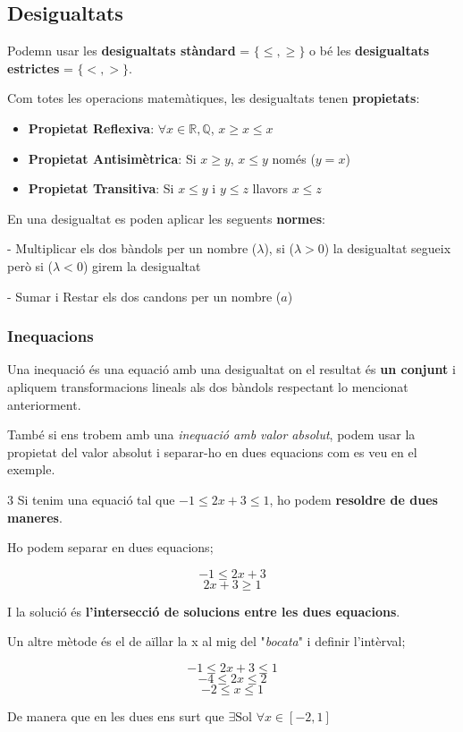 \documentclass[12pt]{article}
\newcommand{\R}{\mathbb{R}}
\newcommand{\Q}{\mathbb{Q}}
\begin{document}
\subsection{Desigualtats}

Podemn usar les \textbf{desigualtats stàndard} = $\{\leq, \geq\}$ o bé les \textbf{desigualtats estrictes} = $\{<,>\}$.

Com totes les operacions matemàtiques, les desigualtats tenen \textbf{propietats}:

\begin{itemize}
    \item \textbf{Propietat Reflexiva}: $\forall x \in \R, \Q$, $x \geq x \leq x$
    \item \textbf{Propietat Antisimètrica}: Si $ x\geq y$, $x \leq y$ només ($y=x$)
    \item \textbf{Propietat Transitiva}: Si $x \leq y$ i $ y \leq z$ llavors $x \leq z$
\end{itemize}

En una desigualtat es poden aplicar les seguents \textbf{normes}:

- Multiplicar els dos bàndols per un nombre ($\lambda$), si ($\lambda > 0$) la desigualtat segueix però si ($\lambda < 0$) girem la desigualtat

- Sumar i Restar els dos candons per un nombre ($a$)

\subsubsection{Inequacions}

Una inequació és una equació amb una desigualtat on el resultat és \textbf{un conjunt} i apliquem transformacions lineals als dos bàndols respectant lo mencionat anteriorment.

També si ens trobem amb una \textit{inequació amb valor absolut}, podem usar la propietat del valor absolut i separar-ho en dues equacions com es veu en el exemple.

\begin{examplebox}{3}
    Si tenim una equació tal que $-1 \leq 2x + 3 \leq 1$, ho podem \textbf{resoldre de dues maneres}.

    Ho podem separar en dues equacions;

    \[ -1 \leq 2x + 3\]
    \[2x+3 \geq 1\]

    I la solució és \textbf{l'intersecció de solucions entre les dues equacions}.

    Un altre mètode és el de aïllar la x al mig del "\textit{bocata}" i definir l'intèrval;

    \[ -1 \leq 2x + 3 \leq 1\]
    \[ -4 \leq 2x  \leq 2\]
    \[ -2 \leq x  \leq 1\]

    De manera que en les dues ens surt que $\exists \text{Sol } \forall x \in [-2,1]$
\end{examplebox}
\end{document}
